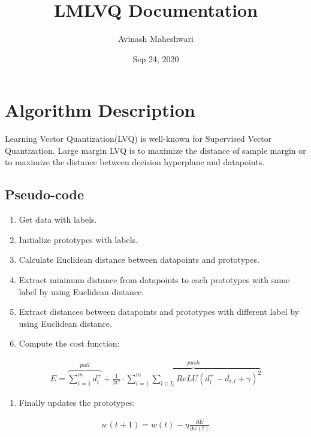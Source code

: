 \documentclass[letterpaper,10pt,english,openany,oneside]{sphinxmanual}
\title{LMLVQ Documentation}
\date{Sep 24, 2020}
\author{Avinash Maheshwari}
\begin{document}
\pagestyle{empty}
\sphinxmaketitle
\pagestyle{plain}
\sphinxtableofcontents
\pagestyle{normal}
\label{\detokenize{index::doc}}



\chapter{Algorithm Description}
\label{\detokenize{index:algorithm-description}}
Learning Vector Quantization(LVQ) is well-known for Supervised Vector Quantization. Large margin LVQ is to maximize the distance of sample margin or to maximize the distance between decision hyperplane and datapoints.


\section{Pseudo-code}
\label{\detokenize{index:pseudo-code}}\begin{enumerate}
\def\theenumi{\arabic{enumi}}
\def\labelenumi{\theenumi .}
\makeatletter\def\p@enumii{\p@enumi \theenumi .}\makeatother
\item {} 
Get data with labels.

\item {} 
Initialize prototypes with labels.

\item {} 
Calculate Euclidean distance between datapoints and prototypes.

\item {} 
Extract minimum distance from datapoints to each prototypes with same label by using Euclidean distance.

\item {} 
Extract distances between datapoints and prototypes with different label by using Euclidean distance.

\item {} 
Compute the cost function:

\end{enumerate}
\begin{equation*}
\begin{split}E = \overbrace{\sum_{i=1}^{m} d_{i}^+}^{pull} + \frac{1}{2C} \cdot \overbrace{\sum_{i=1}^{m} \sum_{l \in I_i} ReLU(d_{i}^+ - d_{i,l} + \gamma)^2}^{push}\end{split}
\end{equation*}\begin{enumerate}
\def\theenumi{\arabic{enumi}}
\def\labelenumi{\theenumi .}
\makeatletter\def\p@enumii{\p@enumi \theenumi .}\makeatother
\setcounter{enumi}{6}
\item {} 
Finally updates the prototypes:

\end{enumerate}
\begin{equation*}
\begin{split}w(t+1) = w(t) - \eta \frac{\partial E}{\partial w(t)}\end{split}
\end{equation*}
\end{document}
